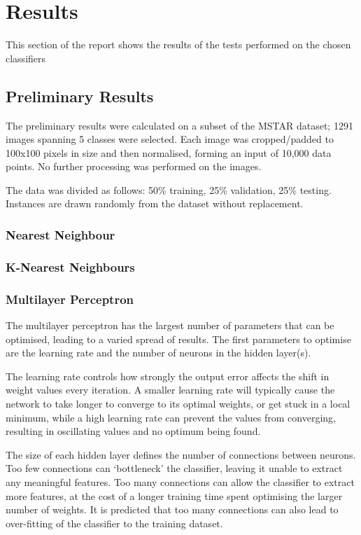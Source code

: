 \chapter{Results}
This section of the report shows the results of the tests performed on the chosen classifiers

\section{Preliminary Results}
The preliminary results were calculated on a subset of the MSTAR dataset; 1291 images spanning 5 classes were selected. Each image was cropped/padded to 100x100 pixels in size and then normalised, forming an input of 10,000 data points. No further processing was performed on the images.

The data was divided as follows: 50\% training, 25\% validation, 25\% testing. Instances are drawn randomly from the dataset without replacement.

\subsection{Nearest Neighbour}

\subsection{K-Nearest Neighbours}

\subsection{Multilayer Perceptron}
The multilayer perceptron has the largest number of parameters that can be optimised, leading to a varied spread of results. The first parameters to optimise are the learning rate and the number of neurons in the hidden layer(s).

The learning rate controls how strongly the output error affects the shift in weight values every iteration. A smaller learning rate will typically cause the network to take longer to converge to its optimal weights, or get stuck in a local minimum, while a high learning rate can prevent the values from converging, resulting in oscillating values and no optimum being found.

The size of each hidden layer defines the number of connections between neurons. Too few connections can `bottleneck' the classifier, leaving it unable to extract any meaningful features. Too many connections can allow the classifier to extract more features, at the cost of a longer training time spent optimising the larger number of weights. It is predicted that too many connections can also lead to over-fitting of the classifier to the training dataset.




